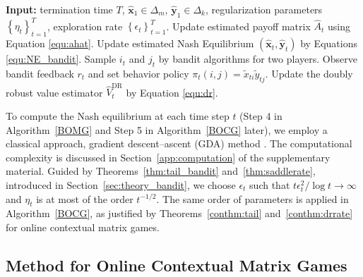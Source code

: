 \documentclass[12pt]{article}
\begin{document}
\begin{algorithm}[hpt]
\caption{Online Matrix Games with Bandit Feedback}
\label{BOMG}
\begin{algorithmic}[1]
\State \textbf{Input:} termination time $T$, \(\widehat{\bm{x}}_1 \in \Delta_{m} \), \(\widehat{\bm{y}}_1 \in \Delta_{k}\), 
regularization parameters $\left\{\eta_t \right\}_{t=1}^T$, exploration rate $\left\{\epsilon_t \right\}_{t=1}^T$.
    \State Update estimated payoff matrix $\widehat{A}_t$ using Equation \eqref{equ:ahat}.
    \State Update estimated Nash Equilibrium $(\widehat{\bm{x}}_t,\widehat{\bm{y}}_t)$ by Equations \eqref{equ:NE_bandit}.
    \State Sample $i_t$ and $j_t$ by bandit algorithms for two players.
    \State Observe bandit feedback $r_t$ and set behavior policy $\pi_t(i,j)=\widetilde{x}_{ti} \widetilde{y}_{tj}$.
    \State Update the doubly robust value estimator $\widehat{V}_t^{\text{DR}}$ by Equation \eqref{equ:dr}.     
\EndFor
\end{algorithmic}
\end{algorithm}

To compute the Nash equilibrium at each time step $t$ (Step 4 in Algorithm~\ref{BOMG} and Step 5 in Algorithm~\ref{BOCG} later), we employ a classical approach, gradient descent–ascent (GDA) method \citep[see, e.g.,][]{du2019linear, lin2020gradient}. The computational complexity is discussed in Section~\ref{app:computation} of the supplementary material. Guided by Theorems~\ref{thm:tail_bandit} and~\ref{thm:saddlerate}, introduced in Section~\ref{sec:theory_bandit}, we choose $\epsilon_t$ such that $t \epsilon_t^2/ \log t \to \infty$ and $\eta_t$ is at most of the order $t^{-1/2}$.
The same order of parameters is applied in Algorithm~\ref{BOCG}, as justified by Theorems~\ref{conthm:tail} and~\ref{conthm:drrate} for online contextual matrix games.


\subsection{Method for Online Contextual Matrix Games}
\label{subsec:method_con}
\end{document}

